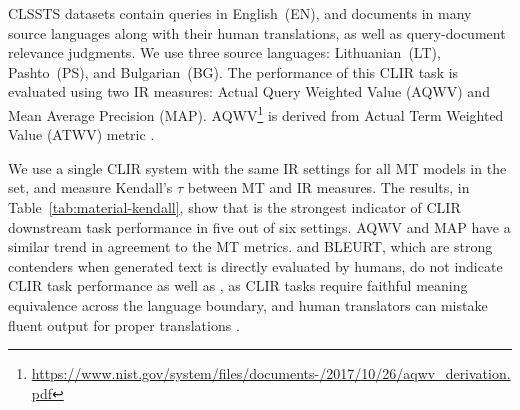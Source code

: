CLSSTS datasets contain queries in English~(EN), and documents in many source languages along with their human translations, as well as query-document relevance judgments. 
We use three source languages: Lithuanian~(LT), Pashto~(PS), and Bulgarian~(BG).
The performance of this CLIR task is evaluated using two IR measures: Actual Query Weighted Value (AQWV) and Mean Average Precision (MAP).
AQWV\footnote{\href{https://www.nist.gov/system/files/documents/2017/10/26/aqwv\_derivation.pdf}{https://www.nist.gov/system/files/documents-/2017/10/26/aqwv\_derivation.pdf}} is derived from Actual Term Weighted Value (ATWV) metric \cite{wegmann2013ATWV}. 


We use a single CLIR system \cite{boschee-etal-2019-saral} with the same IR settings for all MT models in the set, and measure Kendall's $\tau$ between MT and IR measures.
The results, in Table~\ref{tab:material-kendall}, show that  is the strongest indicator of CLIR downstream task performance in five out of six settings.
AQWV and MAP have a similar trend in agreement to the MT metrics.
 and BLEURT, which are strong contenders when generated text is directly evaluated by humans, do not indicate CLIR task performance as well as , as CLIR tasks require faithful meaning equivalence across the language boundary, and human translators can mistake fluent output for proper translations \cite{callison-burch-etal-2007-meta}. 



